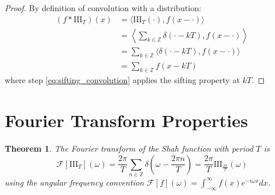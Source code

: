 \documentclass{article}
\newtheorem{theorem}{Theorem}
\begin{document}
\begin{proof}
By definition of convolution with a distribution:
\begin{align}
(f * \text{III}_T)(x) &= \langle \text{III}_T(\cdot), f(x - \cdot) \rangle \label{eq:convolution_def}\\
&= \left\langle \sum_{k \in \mathbb{Z}} \delta(\cdot - kT), f(x - \cdot) \right\rangle \label{eq:shah_in_convolution}\\
&= \sum_{k \in \mathbb{Z}} \langle \delta(\cdot - kT), f(x - \cdot) \rangle \label{eq:sum_linearity}\\
&= \sum_{k \in \mathbb{Z}} f(x - kT) \label{eq:sifting_convolution}
\end{align}
where step \eqref{eq:sifting_convolution} applies the sifting property at $kT$.
\end{proof}

\section{Fourier Transform Properties}

\begin{theorem}
\label{thm:shah_fourier}
The Fourier transform of the Shah function with period $T$ is
\begin{equation}
\label{eq:shah_fourier_transform}
\mathcal{F}[\text{III}_T](\omega) = \frac{2\pi}{T} \sum_{n \in \mathbb{Z}} \delta\left(\omega - \frac{2\pi n}{T}\right) = \frac{2\pi}{T} \text{III}_{\frac{2\pi}{T}}(\omega)
\end{equation}
using the angular frequency convention $\mathcal{F}[f](\omega) = \int_{-\infty}^{\infty} f(x) e^{-i\omega x} dx$.
\end{theorem}
\end{document}
